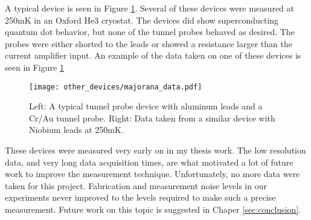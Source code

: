 A typical device is seen in Figure \ref{fig:majorana_data}. Several of these devices were measured at 250mK in an Oxford He3 cryostat. The devices did show superconducting quantum dot behavior, but none of the tunnel probes behaved as desired. The probes were either shorted to the leads or showed a resistance larger than the current amplifier input. An example of the data taken on one of these devices is seen in Figure \ref{fig:majorana_data}

\begin{figure}
    \centering
    \texttt{[image: other\_devices/majorana\_data.pdf]}
    \caption{Left: A typical tunnel probe device with aluminum leads and a Cr/Au tunnel probe. Right: Data taken from a similar device with Niobium leads at 250mK.}
    \label{fig:majorana_data}
\end{figure}

These devices were measured very early on in my thesis work. The low resolution data, and very long data acquisition times, are what motivated a lot of future work to improve the measurement technique. Unfortunately, no more data were taken for this project. Fabrication and measurement noise levels in our experiments never improved to the levels required to make such a precise measurement. Future work on this topic is suggested in Chaper \ref{sec:conclusion}.